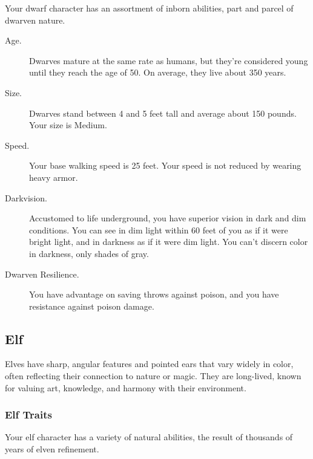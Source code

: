 Your dwarf character has an assortment of inborn abilities, part and
parcel of dwarven nature.

\begin{description}
\item[Age.]
Dwarves mature at the same rate as humans, but they're considered young
until they reach the age of 50. On average, they live about 350 years.
\item[Size.]
Dwarves stand between 4 and 5 feet tall and average about 150 pounds.
Your size is Medium.
\item[Speed.]
Your base walking speed is 25 feet. Your speed is not reduced by wearing
heavy armor.
\item[Darkvision.]
Accustomed to life underground, you have superior vision in dark and dim
conditions. You can see in dim light within 60 feet of you as if it were
bright light, and in darkness as if it were dim light. You can't discern
color in darkness, only shades of gray.
\item[Dwarven Resilience.]
You have advantage on saving throws against poison, and you have
resistance against poison damage.
\end{description}

\subsection{Elf}\label{_elf}

Elves have sharp, angular features and pointed ears that vary widely in
color, often reflecting their connection to nature or magic. They are
long-lived, known for valuing art, knowledge, and harmony with their
environment.

\subsubsection{Elf Traits}\label{_elf_traits}

Your elf character has a variety of natural abilities, the result of
thousands of years of elven refinement.

